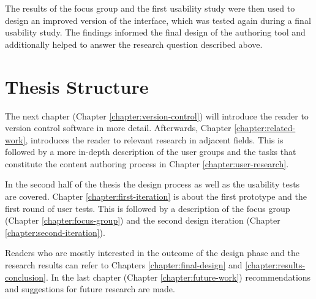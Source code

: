 The results of the focus group and the first usability study were then used to design an improved version of the interface, which was tested again during a final usability study. The findings informed the final design of the authoring tool and additionally helped to answer the research question described above.


\section{Thesis Structure}
The next chapter (Chapter \ref{chapter:version-control}) will introduce the reader to version control software in more detail. Afterwards, Chapter \ref{chapter:related-work}, introduces the reader to relevant research in adjacent fields. This is followed by a more in-depth description of the user groups and the tasks that constitute the content authoring process in Chapter \ref{chapter:user-research}.

In the second half of the thesis the design process as well as the usability tests are covered. Chapter \ref{chapter:first-iteration} is about the first prototype and the first round of user tests. This is followed by a description of the focus group (Chapter \ref{chapter:focus-group}) and the second design iteration (Chapter \ref{chapter:second-iteration}).

Readers who are mostly interested in the outcome of the design phase and the research results can refer to Chapters \ref{chapter:final-design} and \ref{chapter:results-conclusion}. In the last chapter (Chapter \ref{chapter:future-work}) recommendations and suggestions for future research are made.













